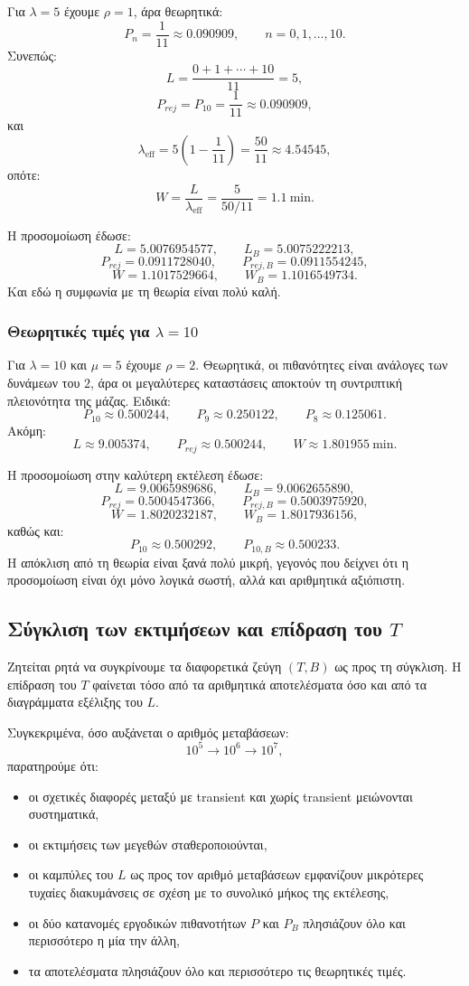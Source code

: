 \documentclass{article}
\begin{document}
Για $\lambda=5$ έχουμε $\rho=1$, άρα θεωρητικά:
\[
P_n=\frac{1}{11}\approx 0.090909,\qquad n=0,1,\ldots,10.
\]
Συνεπώς:
\[
L=\frac{0+1+\cdots+10}{11}=5,
\]
\[
P_{rej}=P_{10}=\frac{1}{11}\approx 0.090909,
\]
και
\[
\lambda_{\text{eff}}=5\left(1-\frac{1}{11}\right)=\frac{50}{11}\approx 4.54545,
\]
οπότε:
\[
W=\frac{L}{\lambda_{\text{eff}}}=\frac{5}{50/11}=1.1 \ \text{min}.
\]

Η προσομοίωση έδωσε:
\[
L=5.0076954577,\qquad L_B=5.0075222213,
\]
\[
P_{rej}=0.0911728040,\qquad P_{rej,B}=0.0911554245,
\]
\[
W=1.1017529664,\qquad W_B=1.1016549734.
\]
Και εδώ η συμφωνία με τη θεωρία είναι πολύ καλή.

\subsubsection*{Θεωρητικές τιμές για $\lambda=10$}

Για $\lambda=10$ και $\mu=5$ έχουμε $\rho=2$. Θεωρητικά, οι πιθανότητες είναι ανάλογες των δυνάμεων του $2$, άρα οι μεγαλύτερες καταστάσεις αποκτούν τη συντριπτική πλειονότητα της μάζας. Ειδικά:
\[
P_{10}\approx 0.500244,\qquad P_9\approx 0.250122,\qquad P_8\approx 0.125061.
\]
Ακόμη:
\[
L\approx 9.005374,\qquad P_{rej}\approx 0.500244,\qquad W\approx 1.801955 \ \text{min}.
\]

Η προσομοίωση στην καλύτερη εκτέλεση έδωσε:
\[
L=9.0065989686,\qquad L_B=9.0062655890,
\]
\[
P_{rej}=0.5004547366,\qquad P_{rej,B}=0.5003975920,
\]
\[
W=1.8020232187,\qquad W_B=1.8017936156,
\]
καθώς και:
\[
P_{10}\approx 0.500292,\qquad P_{10,B}\approx 0.500233.
\]
Η απόκλιση από τη θεωρία είναι ξανά πολύ μικρή, γεγονός που δείχνει ότι η προσομοίωση είναι όχι μόνο λογικά σωστή, αλλά και αριθμητικά αξιόπιστη.

\subsection{Σύγκλιση των εκτιμήσεων και επίδραση του $T$}

Ζητείται ρητά να συγκρίνουμε τα διαφορετικά ζεύγη $(T,B)$ ως προς τη σύγκλιση. Η επίδραση του $T$ φαίνεται τόσο από τα αριθμητικά αποτελέσματα όσο και από τα διαγράμματα εξέλιξης του $L$.

Συγκεκριμένα, όσο αυξάνεται ο αριθμός μεταβάσεων:
\[
10^5 \to 10^6 \to 10^7,
\]
παρατηρούμε ότι:

\begin{itemize}
    \item οι σχετικές διαφορές μεταξύ με transient και χωρίς transient μειώνονται συστηματικά,
    \item οι εκτιμήσεις των μεγεθών σταθεροποιούνται,
    \item οι καμπύλες του $L$ ως προς τον αριθμό μεταβάσεων εμφανίζουν μικρότερες τυχαίες διακυμάνσεις σε σχέση με το συνολικό μήκος της εκτέλεσης,
    \item οι δύο κατανομές εργοδικών πιθανοτήτων $P$ και $P_B$ πλησιάζουν όλο και περισσότερο η μία την άλλη,
    \item τα αποτελέσματα πλησιάζουν όλο και περισσότερο τις θεωρητικές τιμές.
\end{itemize}
\end{document}

